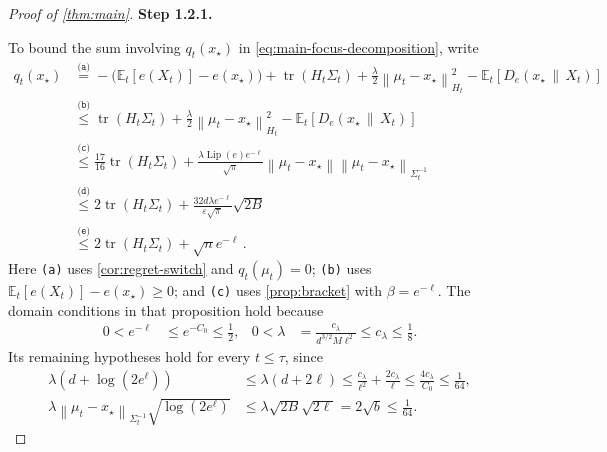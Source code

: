 \documentclass[11pt]{article}
\newcommand{\proofstepinline}[1]{%
    {\sffamily\bfseries\color{blue!55!black}Step #1.}\enspace
}
\newcommand{\E}{\mathbb E}
\newcommand{\tr}{\operatorname{tr}}
\newcommand{\Lip}{\operatorname{Lip}}
\newcommand{\1}{\mathbf 1}
\newcommand{\eps}{\varepsilon}
\newcommand{\norm}[1]{\left\lVert #1\right\rVert}
\newcommand{\normm}[2]{\left\lVert #1\right\rVert_{#2}}
\begin{document}
\begin{proof}[Proof of \cref{thm:main}]
    \proofstepinline{1.2.1}
    To bound the sum involving $q_t(x_\star)$ in
    \eqref{eq:main-focus-decomposition}, write
    \begin{align}
        q_t(x_\star)
         &
        \stackrel{\texttt{(a)}}{=}
        -\bigl(\E_t[e(X_t)]-e(x_\star)\bigr)
        +\tr(H_t\Sigma_t)
        +\frac\lambda2\normm{\mu_t-x_\star}{H_t}^2
        -\E_t[D_e(x_\star\,\|\,X_t)]         \\
         &
        \stackrel{\texttt{(b)}}{\leq}
        \tr(H_t\Sigma_t)
        +\frac\lambda2\normm{\mu_t-x_\star}{H_t}^2
        -\E_t[D_e(x_\star\,\|\,X_t)]         \\
         &
        \stackrel{\texttt{(c)}}{\leq}
        \frac{17}{16}\tr(H_t\Sigma_t)
        +\frac{\lambda\Lip(e)e^{-\ell}}{\sqrt\pi}
        \norm{\mu_t-x_\star}
        \normm{\mu_t-x_\star}{\Sigma_t^{-1}} \\
         &
        \stackrel{\texttt{(d)}}{\leq}
        2\tr(H_t\Sigma_t)
        +\frac{32d \lambda e^{-\ell}}{\eps\sqrt\pi}
        \sqrt{2B}
        \\
         & \stackrel{\texttt{(e)}}{\leq}
        2\tr(H_t\Sigma_t)
        + \sqrt{n}e^{-\ell}\,.
        \label{eq:main-q-upper}
    \end{align}
    Here \texttt{(a)} uses \cref{cor:regret-switch} and
    $q_t(\mu_t)=0$;
    \texttt{(b)} uses
    $\E_t[e(X_t)]-e(x_\star)\geq0$;
    and \texttt{(c)} uses \cref{prop:bracket} with $\beta=e^{-\ell}$.
    The domain conditions in that proposition hold because
    \begin{align}
        0<e^{-\ell}
         & \leq e^{-C_0}\leq\frac12,
         &
        0<\lambda
         & =\frac{c_\lambda}{d^{3/2}M\ell^2}
        \leq c_\lambda\leq\frac18.
    \end{align}
    Its remaining hypotheses hold for every $t\leq\tau$, since
    \begin{align}
        \lambda\left(d+\log(2e^\ell)\right)
         & \leq
        \lambda\left(d+2\ell\right)
        \leq
        \frac{c_\lambda}{\ell^2}
        +\frac{2c_\lambda}{\ell}
        \leq
        \frac{4c_\lambda}{C_0}
        \leq\frac1{64},
        \label{eq:main-stability-bracket-scale}
        \\
        \lambda
        \normm{\mu_t-x_\star}{\Sigma_t^{-1}}
        \sqrt{\log(2e^\ell)}
         & \leq
        \lambda\sqrt{2B}\sqrt{2\ell}
        =2\sqrt b
        \leq\frac1{64}.
        \label{eq:main-stability-bracket-focus}
    \end{align}

\end{proof}
\end{document}
